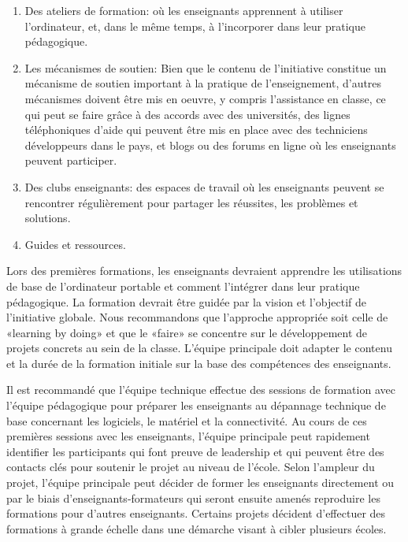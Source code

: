\documentclass[11pt]{article}
\begin{document}
\begin{enumerate}
\item Des ateliers de formation: où les enseignants apprennent à utiliser
   l'ordinateur, et, dans le même temps, à l'incorporer dans leur pratique
   pédagogique.
\item Les mécanismes de soutien: Bien que le contenu de l'initiative constitue
   un mécanisme de soutien important à la pratique de l'enseignement,
   d'autres mécanismes doivent être mis en oeuvre, y compris l'assistance en
   classe, ce qui peut se faire grâce à des accords avec des universités,
   des lignes téléphoniques d'aide qui peuvent être mis en place avec des
   techniciens développeurs dans le pays, et blogs ou des forums en ligne
   où les enseignants peuvent participer.
\item Des clubs enseignants: des espaces de travail où les enseignants peuvent
   se rencontrer régulièrement pour partager les réussites, les problèmes
   et solutions.
\item Guides et ressources.
\end{enumerate}

Lors des premières formations, les enseignants devraient apprendre les
utilisations de base de l'ordinateur portable et comment l'intégrer dans
leur pratique pédagogique. La formation devrait être guidée par la vision
et l'objectif de l'initiative globale. Nous recommandons que l'approche
appropriée soit celle de «learning by doing» et que le «faire» se concentre
sur le développement de projets concrets au sein de la classe. L'équipe
principale doit adapter le contenu et la durée de la formation initiale sur
la base des compétences des enseignants.

Il est recommandé que l'équipe technique effectue des sessions de formation
avec l'équipe pédagogique pour préparer les enseignants au dépannage
technique de base concernant les logiciels, le matériel et la
connectivité. Au cours de ces premières sessions avec les enseignants,
l'équipe principale peut rapidement identifier les participants qui font
preuve de leadership et qui peuvent être des contacts clés pour soutenir le
projet au niveau de l'école. Selon l'ampleur du projet, l'équipe principale
peut décider de former les enseignants directement ou par le biais
d'enseignants-formateurs qui seront ensuite amenés reproduire les
formations pour d'autres enseignants. Certains projets décident d'effectuer
des formations à grande échelle dans une démarche visant à cibler plusieurs
écoles.
\end{document}
